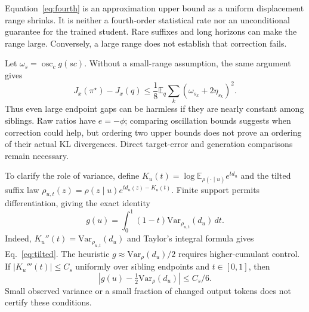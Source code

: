 \documentclass[pdflatex,sn-mathphys-num,review]{sn-jnl}
\theoremstyle{thmstyleone}
\theoremstyle{thmstyletwo}
\theoremstyle{thmstylethree}
\providecommand{\popt}{\pi^{\star}}
\providecommand{\E}{\mathbb{E}}
\providecommand{\Var}{\mathrm{Var}}
\providecommand{\osc}{\operatorname{osc}}
\begin{document}
Equation~\eqref{eq:fourth} is an approximation upper bound as a uniform displacement range shrinks. It is neither a fourth-order statistical rate nor an unconditional guarantee for the trained student. Rare suffixes and long horizons can make the range large. Conversely, a large range does not establish that correction fails.

Let $\omega_s=\osc_c g(sc)$. Without a small-range assumption, the same argument gives
\begin{equation}
J_x(\popt)-J_x(q)\le\frac18\E_q\sum_k(\omega_{s_k}+2\eta_{s_k})^2.
\label{eq:sibling-bound}
\end{equation}
Thus even large endpoint gaps can be harmless if they are nearly constant among siblings. Raw ratios have $e=-\phi$; comparing oscillation bounds suggests when correction could help, but ordering two upper bounds does not prove an ordering of their actual KL divergences. Direct target-error and generation comparisons remain necessary.

To clarify the role of variance, define $K_u(t)=\log\E_{\rho(\cdot\mid u)}e^{t d_u}$ and the tilted suffix law $\rho_{u,t}(z)=\rho(z\mid u)e^{t d_u(z)-K_u(t)}$. Finite support permits differentiation, giving the exact identity
\begin{equation}
g(u)=\int_0^1(1-t)\Var_{\rho_{u,t}}(d_u)\,dt.
\label{eq:tilted}
\end{equation}
Indeed, $K_u''(t)=\Var_{\rho_{u,t}}(d_u)$ and Taylor's integral formula gives Eq.~\eqref{eq:tilted}. The heuristic $g\approx\Var_\rho(d_u)/2$ requires higher-cumulant control. If $|K_u'''(t)|\le C_s$ uniformly over sibling endpoints and $t\in[0,1]$, then
\begin{equation}
\left|g(u)-\tfrac12\Var_\rho(d_u)\right|\le C_s/6.
\label{eq:variance-remainder}
\end{equation}
Small observed variance or a small fraction of changed output tokens does not certify these conditions.
\end{document}
